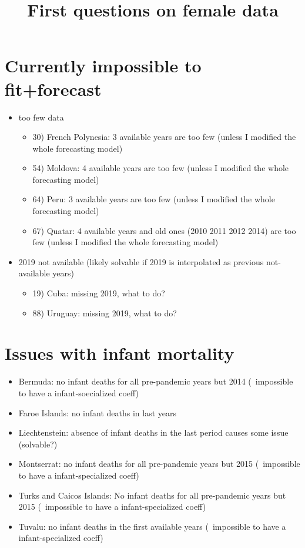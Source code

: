 \documentclass{article}
\title{First questions on female data}
\begin{document}
	\maketitle
	\section*{Currently impossible to fit+forecast}
	
	
\begin{itemize}
	\item too few data
	\begin{itemize}
	\item 30) French Polynesia: 3 available years are too few (unless I modified the whole forecasting model)
	\item 54) Moldova: 4 available years are too few (unless I modified the whole forecasting model)
	\item 64) Peru: 3 available years are too few (unless I modified the whole forecasting model)
	\item 67) Quatar: 4 available years and old ones (2010 2011 2012 2014) are too few (unless I modified the whole forecasting model)
	\end{itemize}
	\item 2019 not available (likely solvable if 2019 is interpolated as previous not-available years)
	\begin{itemize}
	\item 19) Cuba: missing 2019, what to do?
	\item 88) Uruguay: missing 2019, what to do?
	\end{itemize}
\end{itemize}
	
	\section*{Issues with infant mortality}
	
	\begin{itemize}
	\item Bermuda: no infant deaths for all pre-pandemic years but 2014 (~impossible to have a infant-soecialized coeff)
	\item Faroe Islands: no infant deaths in last years
	\item Liechtenstein: absence of infant deaths in the last period causes some issue (solvable?) 
	\item Montserrat: no infant deaths for all pre-pandemic years but 2015 (~impossible to have a infant-specialized coeff)
	\item Turks and Caicos Islands: No infant deaths for all pre-pandemic years but 2015 (~impossible to have a infant-specialized coeff)
	\item Tuvalu: no infant deaths in the first available years (~impossible to have a infant-specialized coeff)
	
	\end{itemize}
	
\end{document}
